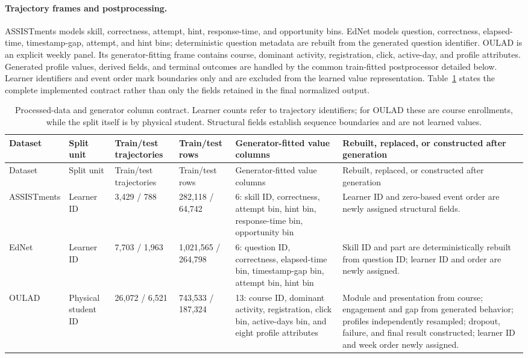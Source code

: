 \documentclass[10pt]{article}
\begin{document}
\paragraph{Trajectory frames and postprocessing.}
ASSISTments models skill, correctness, attempt, hint, response-time, and
opportunity bins. EdNet models question, correctness, elapsed-time,
timestamp-gap, attempt, and hint bins; deterministic question metadata are
rebuilt from the generated question identifier. OULAD is an explicit weekly
panel. Its generator-fitting frame contains course, dominant activity,
registration, click, active-day, and profile attributes. Generated profile
values, derived fields, and terminal outcomes are handled by the common
train-fitted postprocessor detailed below. Learner identifiers and event order
mark boundaries only and are excluded from the learned value representation.
Table~\ref{tab:supp-data-contract}
states the complete implemented contract rather than only the fields retained
in the final normalized output.

\begingroup
\scriptsize
\setlength{\tabcolsep}{3pt}
\begin{longtable}{@{}p{1.75cm}p{1.75cm}p{2.15cm}p{2.15cm}p{4.55cm}p{4.35cm}@{}}
\caption{Processed-data and generator column contract. Learner counts refer to trajectory identifiers; for OULAD these are course enrollments, while the split itself is by physical student. Structural fields establish sequence boundaries and are not learned values.}\label{tab:supp-data-contract}\\
\toprule
Dataset & Split unit & Train/test trajectories & Train/test rows & Generator-fitted value columns & Rebuilt, replaced, or constructed after generation \\
\midrule
\endfirsthead
\toprule
Dataset & Split unit & Train/test trajectories & Train/test rows & Generator-fitted value columns & Rebuilt, replaced, or constructed after generation \\
\midrule
\endhead
\bottomrule
\endlastfoot
ASSISTments & Learner ID & 3,429 / 788 & 282,118 / 64,742 & 6: skill ID, correctness, attempt bin, hint bin, response-time bin, opportunity bin & Learner ID and zero-based event order are newly assigned structural fields. \\
EdNet & Learner ID & 7,703 / 1,963 & 1,021,565 / 264,798 & 6: question ID, correctness, elapsed-time bin, timestamp-gap bin, attempt bin, hint bin & Skill ID and part are deterministically rebuilt from question ID; learner ID and order are newly assigned. \\
OULAD & Physical student ID & 26,072 / 6,521 & 743,533 / 187,324 & 13: course ID, dominant activity, registration, click bin, active-days bin, and eight profile attributes & Module and presentation from course; engagement and gap from generated behavior; profiles independently resampled; dropout, failure, and final result constructed; learner ID and week order newly assigned. \\
\end{longtable}
\endgroup
\end{document}
